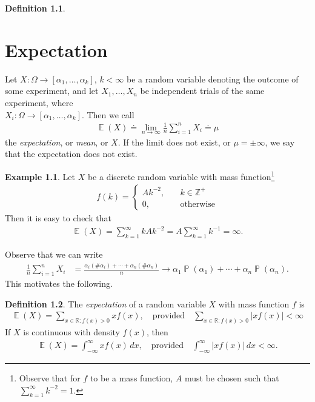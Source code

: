 \documentclass[12pt]{amsbook}
\newcommand{\rr}{\mathbb{R}}
\newcommand{\zz}{\mathbb{Z}}
\DeclareMathOperator{\ex}{\mathbb{E}}
\DeclareMathOperator{\prob}{\mathbb{P}}
\theoremstyle{plain}
\theoremstyle{definition}
\newtheorem*{definition}{Definition}
\newtheorem*{example}{Example}
\theoremstyle{remark}
\numberwithin{equation}{section}  %
\begin{document}
\begin{definition}
	\chapter{Expectation}
	Let $X: \Omega \to [\alpha_1, \ldots, \alpha_k]$, $k < \infty$ be a random
	variable denoting the outcome of some experiment, and let $X_1, \ldots, 
	X_n$ be independent trials
	of the same experiment, where \\ $X_i:
	\Omega \to [\alpha_1, \ldots, \alpha_k]$. Then we 
	call
	\begin{align*}
		\ex(X) \doteq \lim_{n \to \infty} \frac{1}{n} \sum_{i =1}^n X_i \doteq 
		\mu 
	\end{align*}
	the \emph{expectation}, or \emph{mean}, or $X$. If the limit does not exist,
	or $\mu = \pm \infty$, we say that the expectation does not exist.
\end{definition}
\begin{example}
	Let $X$ be a discrete random variable with mass function\footnote{
		Observe that for $f$ to be a mass function, $A$ must be chosen such that
		$\sum_{k = 1}^{\infty} k^{-2} = 1$.}
		\begin{align*}
			f(k) = \begin{cases}
				A k^{-2},  \quad &k\in \zz^{+} 
				\\
				0, \quad & \text{otherwise}
			\end{cases}
		\end{align*}
		Then it is easy to check that
		\begin{align*}
			\ex(X) = \sum_{k=1}^{\infty} k A k^{-2} = A \sum_{k=1}^{\infty} k^{-1} = 
			\infty.
		\end{align*}
	\end{example}
	Observe that we can write
	\begin{align*}
		\frac{1}{n} \sum_{i = 1}^n X_i
		& = \frac{\alpha_i (\#\alpha_i) + \cdots +
		\alpha_n (\#\alpha_n)}{n}
		\to \alpha_1 \prob(\alpha_1) + \cdots + \alpha_n \prob(\alpha_n).
	\end{align*}
	This motivates the following.
	\begin{definition}
		The \emph{expectation} of a random variable $X$ with mass function $f$ is
		\begin{align*}
			\ex(X) = \sum_{x \in \rr: f(x) > 0} x f(x), \quad \text{provided} \quad
			\sum_{x \in \rr: f(x) > 0} |x
			f(x) | <
			\infty
		\end{align*}
		If $X$ is continuous with density $f(x)$, then
		\begin{align*}
			\ex(X) = \int_{-\infty}^{\infty} x f(x) \, dx, \quad \text{provided} \quad
			\int_{-\infty}^{\infty} |x f(x)| \, dx < \infty.
		\end{align*}
	\end{definition}
\end{document}
